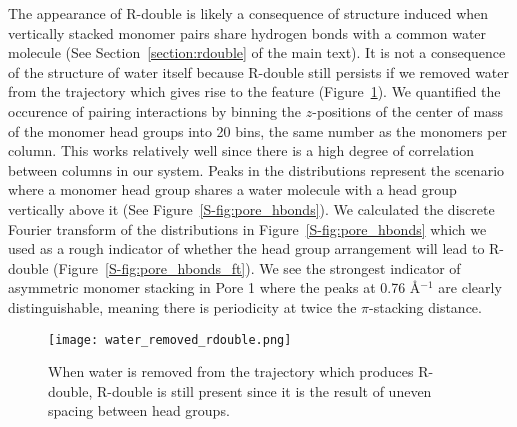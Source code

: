   The appearance of R-double is likely a consequence of structure induced when
  vertically stacked monomer pairs share hydrogen bonds with a common water molecule (See
  Section~\ref{section:rdouble} of the main text). It is not a consequence of the 
  structure of water itself because R-double still persists if we removed water from 
  the trajectory which gives rise to the feature (Figure~\ref{S-fig:rdouble_water_removed}). 
  We quantified the occurence of pairing interactions by binning the $z$-positions of the center of mass of 
  the monomer head groups into 20 bins, the same number as the monomers per column. 
  This works relatively well since there is a high degree of correlation between
  columns in our system. Peaks in the distributions represent the scenario where a monomer head group
  shares a water molecule with a head group vertically above it (See Figure~\ref{S-fig:pore_hbonds}).
  We calculated the discrete Fourier transform of the distributions in Figure~\ref{S-fig:pore_hbonds}
  which we used as a rough indicator of whether the head group arrangement will lead to R-double
  (Figure~\ref{S-fig:pore_hbonds_ft}). We see the strongest indicator of asymmetric monomer
  stacking in Pore 1 where the peaks at 0.76 \AA$^{-1}$ are clearly distinguishable, meaning
  there is periodicity at twice the $\pi$-stacking distance.
  
  \begin{figure}[!htb]
  \centering
  \texttt{[image: water\_removed\_rdouble.png]}
  \caption{When water is removed from the trajectory which produces R-double,
  R-double is still present since it is the result of uneven spacing between 
  head groups.}\label{S-fig:rdouble_water_removed}
  \end{figure}
  
